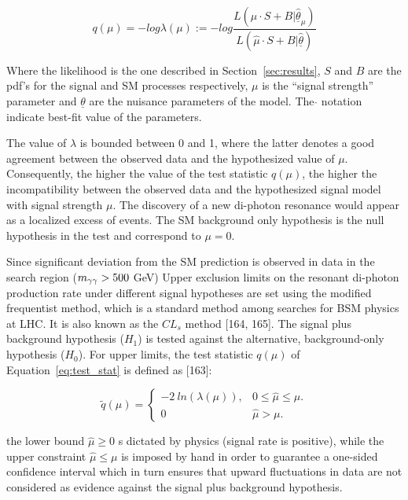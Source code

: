 \begin{equation}
 q(\mu) = -log \lambda(\mu) := -log \frac{ L(\mu \cdot S + B | \underline{\hat\theta}_{\mu} ) } {L (\hat\mu
  \cdot S + B | \underline{\hat\theta} )}
\end{equation}
\label{eq:test_stat}

Where the likelihood is the one described in Section~\ref{sec:results},
$S$ and $B$ are the pdf's for the signal and SM processes respectively, $\mu$ is
the ``signal strength'' parameter and $\underline\theta$ are the nuisance parameters of
the model. The $\hat{}$ notation indicate best-fit value of the parameters.

The value of $\lambda$ is bounded between 0 and 1, where the latter denotes a good agreement between the
observed data and the hypothesized value of $\mu$. Consequently, the higher the value of
the test statistic $q(\mu)$, the higher the incompatibility between the observed data and the
hypothesized signal model with signal strength $\mu$.
The discovery of a new di-photon resonance would appear as a localized excess of events.
The SM background only hypothesis is the null hypothesis in the test and correspond to $\mu = 0$.

Since significant deviation from the SM prediction is observed in data in the search region ($m_{\gamma\gamma} > 500$ GeV)
Upper exclusion limits on the resonant di-photon production rate under different signal
hypotheses are set using the modified frequentist method, which is a standard method among searches
for BSM physics at LHC. It is also known
as the $CL_s$ method [164, 165]. The signal plus background hypothesis ($H_1$) 
is tested against the alternative, background-only hypothesis ($H_0$). For
upper limits, the test statistic $q(\mu)$ of Equation~\ref{eq:test_stat} is defined as [163]:

\begin{equation}
  \tilde{q}(\mu) = \begin{cases}
    -2~ln(\lambda(\mu)), & 0 \leq \hat\mu \leq \mu. \\
    0 & \hat\mu > \mu.
  \end{cases}
\end{equation}  

the lower bound $\hat\mu \geq 0$ s  dictated  by  physics  (signal  rate  is  positive),  while
the upper constraint $\hat\mu \leq \mu$ is imposed by hand in order to guarantee a one-sided
confidence interval which in turn ensures that upward fluctuations in data are not considered as
evidence against the signal plus background hypothesis.



